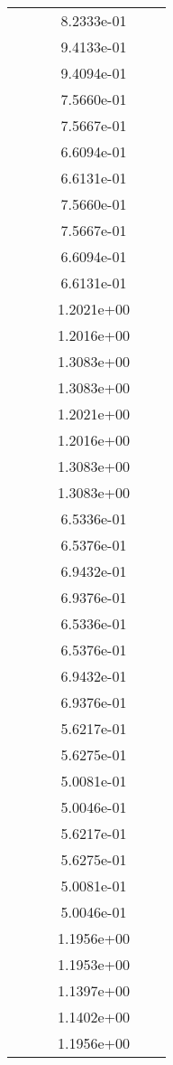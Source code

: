 \begin{xltabular}{\textwidth}{r|rS[table-format=1.3e+2]S[table-format=1.4e+2]S[table-format=1.4e+2]S[table-format=-1.5]}
&  &  & 8.2333e-01 & & \\
&  &  & 9.4133e-01 & & \\
&  &  & 9.4094e-01 & & \\
&  &  & 7.5660e-01 & & \\
&  &  & 7.5667e-01 & & \\
&  &  & 6.6094e-01 & & \\
&  &  & 6.6131e-01 & & \\
&  &  & 7.5660e-01 & & \\
&  &  & 7.5667e-01 & & \\
&  &  & 6.6094e-01 & & \\
&  &  & 6.6131e-01 & & \\
&  &  & 1.2021e+00 & & \\
&  &  & 1.2016e+00 & & \\
&  &  & 1.3083e+00 & & \\
&  &  & 1.3083e+00 & & \\
&  &  & 1.2021e+00 & & \\
&  &  & 1.2016e+00 & & \\
&  &  & 1.3083e+00 & & \\
&  &  & 1.3083e+00 & & \\
&  &  & 6.5336e-01 & & \\
&  &  & 6.5376e-01 & & \\
&  &  & 6.9432e-01 & & \\
&  &  & 6.9376e-01 & & \\
&  &  & 6.5336e-01 & & \\
&  &  & 6.5376e-01 & & \\
&  &  & 6.9432e-01 & & \\
&  &  & 6.9376e-01 & & \\
&  &  & 5.6217e-01 & & \\
&  &  & 5.6275e-01 & & \\
&  &  & 5.0081e-01 & & \\
&  &  & 5.0046e-01 & & \\
&  &  & 5.6217e-01 & & \\
&  &  & 5.6275e-01 & & \\
&  &  & 5.0081e-01 & & \\
&  &  & 5.0046e-01 & & \\
&  &  & 1.1956e+00 & & \\
&  &  & 1.1953e+00 & & \\
&  &  & 1.1397e+00 & & \\
&  &  & 1.1402e+00 & & \\
&  &  & 1.1956e+00 & & \\

\end{xltabular}
